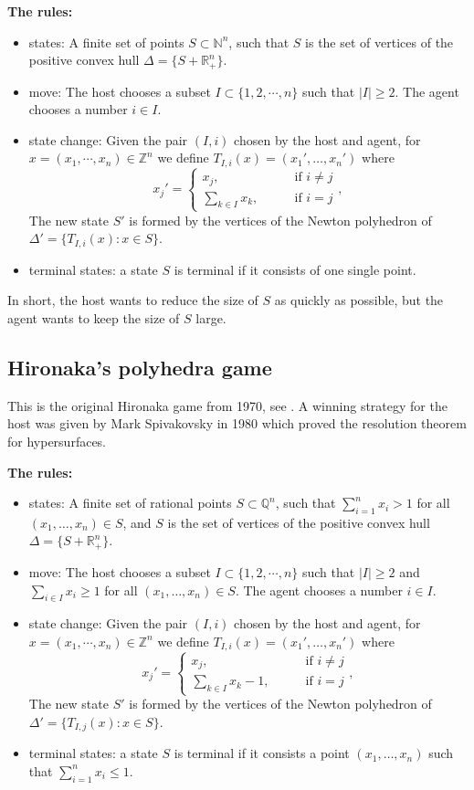 \documentclass{article}
\theoremstyle{plain}
\theoremstyle{definition}
\theoremstyle{remark}
\begin{document}
\textbf{The rules:}
\begin{itemize}
\item states: A finite set of points $S \subset \mathbb{N}^n$, such that $S$ is the set of vertices of the positive 
convex hull $\Delta=\{S+\mathbb{R}^n_+\}$. 
\item move: The host chooses a subset $I\subset \{1,2,\cdots, n\}$ such that $|I|\geq 2$. The agent chooses a number $i\in I$.
\item state change: Given the pair $(I, i)$ chosen by the host and agent, for $x=(x_1,\cdots,x_n)\in \mathbb Z^n$ we define
$T_{I,i}(x)=(x_1',\ldots, x_n')$ where 
$$x_j' = \begin{cases} x_j, &\qquad\text{if } i\neq j \\ \sum\limits_{k\in I} x_k, &\qquad\text{if }i=j
\end{cases},$$
The new state $S'$ is formed by the vertices of the Newton polyhedron of $\Delta'=\{T_{I,i}(x):x\in S\}$.
\item terminal states: a state $S$ is terminal if it consists of one single point. 
\end{itemize}
In short, the host wants to reduce the size of $S$ as quickly as possible, but the agent wants to keep the size of
$S$ large.

\subsection{Hironaka's polyhedra game} 

This is the original Hironaka game from 1970, see \cite{hironaka}. A winning strategy for the host was given by Mark Spivakovsky in 1980 \cite{spivakovsky2} which proved the resolution theorem for hypersurfaces.  

\textbf{The rules:}
\begin{itemize}
\item states: A finite set of rational points $S \subset \mathbb{Q}^n$, such that $\sum_{i=1}^n x_i>1$ for all 
$(x_1,\ldots, x_n)\in S$, and $S$ is the set of vertices of the positive 
convex hull $\Delta=\{S+\mathbb{R}^n_+\}$. 
\item move: The host chooses a subset $I\subset \{1,2,\cdots, n\}$ such that $|I|\geq 2$ and 
$\sum_{i\in I}x_i\ge 1$ for all $(x_1,\ldots, x_n)\in S$. The agent chooses a number $i\in I$.
\item state change: Given the pair $(I,i)$ chosen by the host and agent, for $x=(x_1,\cdots,x_n)\in \mathbb Z^n$ we define
$T_{I,i}(x)=(x_1',\ldots, x_n')$ where 
$$x_j' = \begin{cases} x_j, &\qquad\text{if } i\neq j \\ \sum\limits_{k\in I} x_k -1, &\qquad\text{if }i=j
\end{cases},$$
The new state $S'$ is formed by the vertices of the Newton polyhedron of $\Delta'=\{T_{I,j}(x):x\in S\}$.
\item terminal states: a state $S$ is terminal if it consists a point $(x_1,\ldots, x_n)$ such that 
$\sum_{i=1}^n x_i \le 1$. 
\end{itemize}
\end{document}
